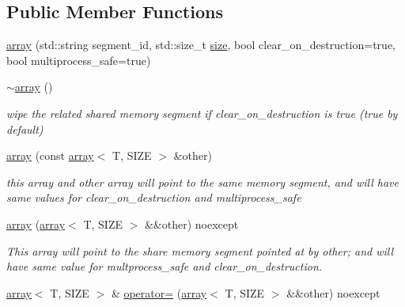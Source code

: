 \subsection*{Public Member Functions}
\begin{DoxyCompactItemize}
\item 
\hyperlink{classshared__memory_1_1array_a95b5abd158cb04ab0644f5aa6df48b2b}{array} (std\+::string segment\+\_\+id, std\+::size\+\_\+t \hyperlink{classshared__memory_1_1array_ad6019f83449e4ea8d1bf4bd0d48c29b0}{size}, bool clear\+\_\+on\+\_\+destruction=true, bool multiprocess\+\_\+safe=true)
\item 
\mbox{\label{classshared__memory_1_1array_a45cad350fdb0170c955c8c367a9e910d}} 
\hyperlink{classshared__memory_1_1array_a45cad350fdb0170c955c8c367a9e910d}{$\sim$array} ()
\begin{DoxyCompactList}\small\item\em wipe the related shared memory segment if clear\+\_\+on\+\_\+destruction is true (true by default) \end{DoxyCompactList}\item 
\mbox{\label{classshared__memory_1_1array_acde1531706ba2ab6c05d7639bc0f6f56}} 
\hyperlink{classshared__memory_1_1array_acde1531706ba2ab6c05d7639bc0f6f56}{array} (const \hyperlink{classshared__memory_1_1array}{array}$<$ T, S\+I\+ZE $>$ \&other)
\begin{DoxyCompactList}\small\item\em this array and other array will point to the same memory segment, and will have same values for clear\+\_\+on\+\_\+destruction and multiprocess\+\_\+safe \end{DoxyCompactList}\item 
\hyperlink{classshared__memory_1_1array_af399f2f20d16dadf8381c61ea5ad42fd}{array} (\hyperlink{classshared__memory_1_1array}{array}$<$ T, S\+I\+ZE $>$ \&\&other) noexcept
\begin{DoxyCompactList}\small\item\em This array will point to the share memory segment pointed at by other; and will have same value for multprocess\+\_\+safe and clear\+\_\+on\+\_\+destruction. \end{DoxyCompactList}\item 
\hyperlink{classshared__memory_1_1array}{array}$<$ T, S\+I\+ZE $>$ \& \hyperlink{classshared__memory_1_1array_ad5b4b2841b2785b188a6371cb7f00f1f}{operator=} (\hyperlink{classshared__memory_1_1array}{array}$<$ T, S\+I\+ZE $>$ \&\&other) noexcept

\end{DoxyCompactItemize}
